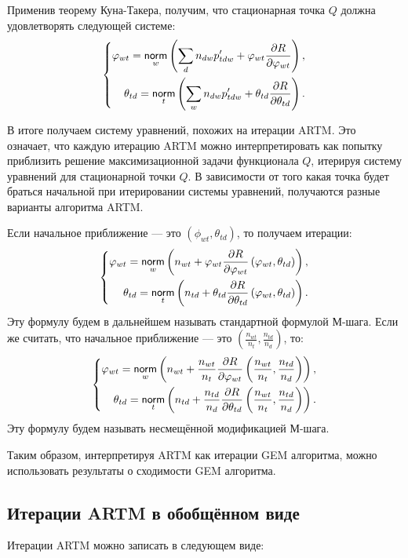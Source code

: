 \documentclass[12pt, twoside]{article}
\begin{document}
Применив теорему Куна-Такера,  получим, что стационарная точка $Q$ должна удовлетворять следующей системе:
\[
\left\{
	\begin{aligned}
		\varphi_{wt}= \mathop{\mathsf{norm}}\limits_w \left( \sum\limits_d n_{dw} p'_{tdw} + \varphi_{wt} \frac{\partial{R}}{\partial{\varphi_{wt}}} \right),\\
		\theta_{td} = \mathop{\mathsf{norm}}\limits_t \left( \sum\limits_w n_{dw} p'_{tdw} + \theta_{td} \frac{\partial{R}}{\partial{\theta_{td}}} \right).
	\end{aligned}
\right.
\]

В итоге получаем систему уравнений, похожих на итерации ARTM. Это означает, что каждую итерацию ARTM можно интерпретировать как попытку приблизить решение максимизационной задачи функционала $Q$, итерируя систему уравнений для стационарной точки $Q$. В зависимости от того какая точка будет браться начальной при итерировании системы уравнений, получаются разные варианты алгоритма ARTM.

Если начальное приближение --- это $(\phi_{wt}, \theta_{td})$, то получаем итерации:
\[
\left\{
	\begin{aligned}
		\varphi_{wt} = \mathop{\mathsf{norm}}\limits_w \left( n_{wt} + \varphi_{wt} \frac{\partial{R}}{\partial{\varphi_{wt}}} \left( \varphi_{wt}, \theta_{td}\right) \right),\\
		\theta_{td} = \mathop{\mathsf{norm}}\limits_t \left( n_{td} + \theta_{td} \frac{\partial{R}}{\partial{\theta_{td}}} \left( \varphi_{wt}, \theta_{td}\right) \right).
	\end{aligned}
\right.
\]
Эту формулу будем в дальнейшем называть стандартной формулой М-шага. Если же считать, что начальное приближение ---  это $\left(\frac{n_{wt}}{n_t}, \frac{n_{td}}{n_d}\right)$, то:
\[
\left\{
	\begin{aligned}
		\varphi_{wt}= \mathop{\mathsf{norm}}\limits_w \left( n_{wt} + \frac{n_{wt}}{n_t} \frac{\partial{R}}{\partial{\varphi_{wt}}} \left(\frac{n_{wt}}{n_t}, \frac{n_{td}}{n_d}\right) \right),\\
		\theta_{td} = \mathop{\mathsf{norm}}\limits_t \left(n_{td} + \frac{n_{td}}{n_d} \frac{\partial{R}}{\partial{\theta_{td}}} \left(\frac{n_{wt}}{n_t}, \frac{n_{td}}{n_d}\right) \right).
	\end{aligned}
\right.
\]
Эту формулу будем называть несмещённой модификацией М-шага.

 Таким образом, интерпретируя ARTM как итерации GEM алгоритма, можно использовать результаты о сходимости GEM алгоритма.

\subsection{Итерации ARTM в обобщённом виде}	  
Итерации ARTM можно записать в следующем виде: 
\end{document}
